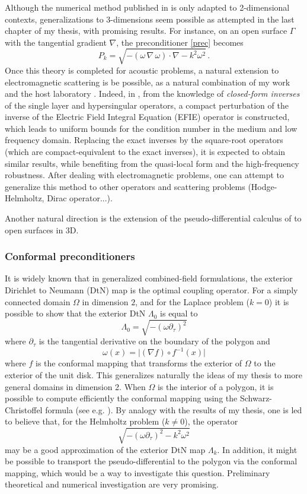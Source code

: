 \documentclass[]{report}
\begin{document}
Although the numerical method published in \cite{alouges2019new} is only adapted to 2-dimensional contexts, generalizations to 3-dimensions seem possible as attempted in the last chapter of my thesis, with promising results. For instance, on an open surface $\Gamma$ with the tangential gradient $\nabla$, the preconditioner \eqref{prec} becomes
\[P_k = \sqrt{-(\omega\,\nabla \,\omega)  \cdot \nabla - k^2 \omega^2}\,.\]
Once this theory is completed for acoustic problems, a natural extension to electromagnetic scattering is be possible, as a natural combination of my work and the host laboratory \cite{hiptmair2019preconditioning}. Indeed, in \cite{hiptmair2019preconditioning}, from the knowledge of \textit{closed-form inverses} of the single layer and hypersingular operators, a compact perturbation of the inverse of the Electric Field Integral Equation (EFIE) operator is constructed, which leads to uniform bounds for the condition number in the medium and low frequency domain. Replacing the exact inverses by the square-root operators (which are compact-equivalent to the exact inverses), it is expected to obtain similar results, while benefiting from the quasi-local form and the high-frequency robustness. After dealing with electromagnetic problems, one can attempt to generalize this method to other operators and scattering problems (Hodge-Helmholtz, Dirac operator...).

Another natural direction is the extension of the pseudo-differential calculus of \cite{averseng2019pseudo} to open surfaces in 3D. 

\subsubsection*{Conformal preconditioners}

It is widely known that in generalized combined-field formulations, the exterior Dirichlet to Neumann (DtN) map is the optimal coupling operator. For a simply connected domain $\Omega$ in dimension $2$, and for the Laplace problem ($k = 0$) it is possible to show that the exterior DtN $\Lambda_0$ is equal to 
\[\Lambda_0 = \sqrt{-(\omega \partial_\tau)^2}\]
where $\partial_\tau$ is the tangential derivative on the boundary of the polygon and \[\omega(x) = \lvert (\nabla f) \circ f^{-1}(x)\rvert\] 
where $f$ is the conformal mapping that transforms the exterior of $\Omega$ to the exterior of the unit disk. This generalizes naturally the ideas of my thesis to more general domains in dimension 2. When $\Omega$ is the interior of a polygon, it is possible to compute efficiently the conformal mapping using the Schwarz-Christoffel formula (see e.g. \cite{driscoll2002schwarz}). By analogy with the results of my thesis, one is led to believe that, for the Helmholtz problem ($k \neq 0$), the operator
\[\sqrt{-(\omega \partial_\tau)^2 - k^2\omega^2}\]
may be a good approximation of the exterior DtN map $\Lambda_k$. In addition, it might be possible to transport the pseudo-differential to the polygon via the conformal mapping, which would be a way to investigate this question. Preliminary theoretical and numerical investigation are very promising. 
\end{document}
